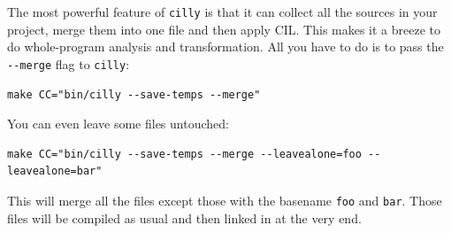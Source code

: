 \documentclass[letterpaper]{article}
\def\t#1{{\tt #1}}
\begin{document}
 The most powerful feature of \t{cilly} is that it can collect all the
sources in your project, merge them into one file and then apply CIL. This
makes it a breeze to do whole-program analysis and transformation. All you
have to do is to pass the \t{-{}-merge} flag to \t{cilly}:
\begin{verbatim}
make CC="bin/cilly --save-temps --merge"
\end{verbatim}

 You can even leave some files untouched:
\begin{verbatim}
make CC="bin/cilly --save-temps --merge --leavealone=foo --leavealone=bar"
\end{verbatim}

 This will merge all the files except those with the basename \t{foo} and
\t{bar}. Those files will be compiled as usual and then linked in at the very
end.
\end{document}
